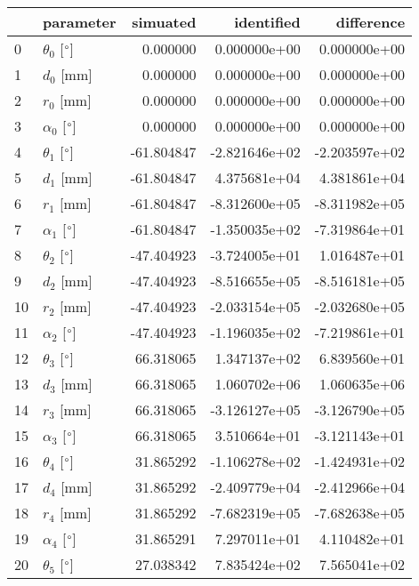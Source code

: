 \documentclass{standalone}%
\begin{document}
%
\normalsize%
\begin{tabular}{llrrr}
\toprule
{} &                 parameter &   simuated &    identified &    difference \\
\midrule
0  &  $\theta_{0}$ [$\degree$] &   0.000000 &  0.000000e+00 &  0.000000e+00 \\
1  &              $d_{0}$ [mm] &   0.000000 &  0.000000e+00 &  0.000000e+00 \\
2  &              $r_{0}$ [mm] &   0.000000 &  0.000000e+00 &  0.000000e+00 \\
3  &  $\alpha_{0}$ [$\degree$] &   0.000000 &  0.000000e+00 &  0.000000e+00 \\
4  &  $\theta_{1}$ [$\degree$] & -61.804847 & -2.821646e+02 & -2.203597e+02 \\
5  &              $d_{1}$ [mm] & -61.804847 &  4.375681e+04 &  4.381861e+04 \\
6  &              $r_{1}$ [mm] & -61.804847 & -8.312600e+05 & -8.311982e+05 \\
7  &  $\alpha_{1}$ [$\degree$] & -61.804847 & -1.350035e+02 & -7.319864e+01 \\
8  &  $\theta_{2}$ [$\degree$] & -47.404923 & -3.724005e+01 &  1.016487e+01 \\
9  &              $d_{2}$ [mm] & -47.404923 & -8.516655e+05 & -8.516181e+05 \\
10 &              $r_{2}$ [mm] & -47.404923 & -2.033154e+05 & -2.032680e+05 \\
11 &  $\alpha_{2}$ [$\degree$] & -47.404923 & -1.196035e+02 & -7.219861e+01 \\
12 &  $\theta_{3}$ [$\degree$] &  66.318065 &  1.347137e+02 &  6.839560e+01 \\
13 &              $d_{3}$ [mm] &  66.318065 &  1.060702e+06 &  1.060635e+06 \\
14 &              $r_{3}$ [mm] &  66.318065 & -3.126127e+05 & -3.126790e+05 \\
15 &  $\alpha_{3}$ [$\degree$] &  66.318065 &  3.510664e+01 & -3.121143e+01 \\
16 &  $\theta_{4}$ [$\degree$] &  31.865292 & -1.106278e+02 & -1.424931e+02 \\
17 &              $d_{4}$ [mm] &  31.865292 & -2.409779e+04 & -2.412966e+04 \\
18 &              $r_{4}$ [mm] &  31.865292 & -7.682319e+05 & -7.682638e+05 \\
19 &  $\alpha_{4}$ [$\degree$] &  31.865291 &  7.297011e+01 &  4.110482e+01 \\
20 &  $\theta_{5}$ [$\degree$] &  27.038342 &  7.835424e+02 &  7.565041e+02 \\

\end{tabular}
\end{document}
